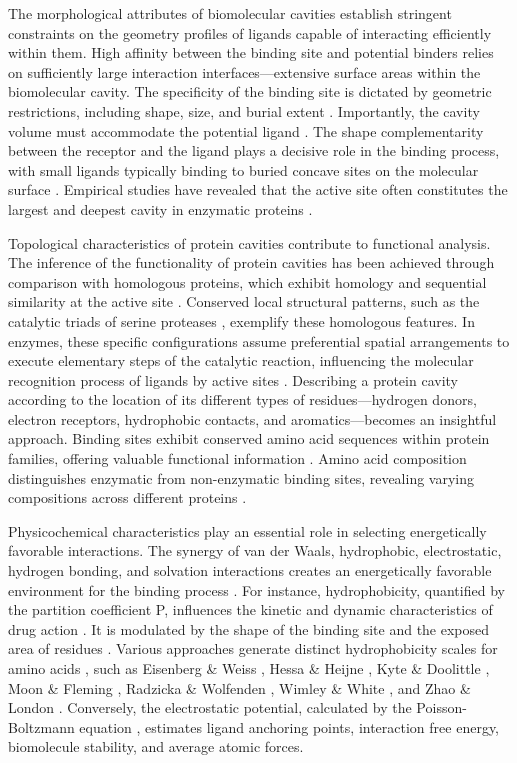 \documentclass[Ingles]{phdthesis}
\begin{document}
The morphological attributes of biomolecular cavities establish stringent constraints on the geometry profiles of ligands capable of interacting efficiently within them. High affinity between the binding site and potential binders relies on sufficiently large interaction interfaces---extensive surface areas within the biomolecular cavity. The specificity of the binding site is dictated by geometric restrictions, including shape, size, and burial extent \cite{laskowski1996,liang1998}. Importantly, the cavity volume must accommodate the potential ligand \cite{stank2016}. The shape complementarity between the receptor and the ligand plays a decisive role in the binding process, with small ligands typically binding to buried concave sites on the molecular surface \cite{henrich2010}. Empirical studies have revealed that the active site often constitutes the largest and deepest cavity in enzymatic proteins \cite{laskowski1996}.

Topological characteristics of protein cavities contribute to functional analysis. The inference of the functionality of protein cavities has been achieved through comparison with homologous proteins, which exhibit homology and sequential similarity at the active site \cite{juncker2009}. Conserved local structural patterns, such as the catalytic triads of serine proteases \cite{dodson1998}, exemplify these homologous features. In enzymes, these specific configurations assume preferential spatial arrangements to execute elementary steps of the catalytic reaction, influencing the molecular recognition process of ligands by active sites \cite{sotriffer2002,henrich2010,thornton2000}. Describing a protein cavity according to the location of its different types of residues---hydrogen donors, electron receptors, hydrophobic contacts, and aromatics---becomes an insightful approach. Binding sites exhibit conserved amino acid sequences within protein families, offering valuable functional information \cite{henrich2010}. Amino acid composition distinguishes enzymatic from non-enzymatic binding sites, revealing varying compositions across different proteins \cite{guerra2019,carlson2008}.

Physicochemical characteristics play an essential role in selecting energetically favorable interactions. The synergy of van der Waals, hydrophobic, electrostatic, hydrogen bonding, and solvation interactions creates an energetically favorable environment for the binding process \cite{henrich2010}. For instance, hydrophobicity, quantified by the partition coefficient P, influences the kinetic and dynamic characteristics of drug action \cite{mannhold2009}. It is modulated by the shape of the binding site and the exposed area of residues \cite{henrich2010}. Various approaches generate distinct hydrophobicity scales for amino acids \cite{heiden1993}, such as Eisenberg \& Weiss \cite{eisenberg1984}, Hessa \& Heijne \cite{hessa2005}, Kyte \& Doolittle \cite{kyte1982}, Moon \& Fleming \cite{moon2011}, Radzicka \& Wolfenden \cite{radzicka1988}, Wimley \& White \cite{wimley1996}, and Zhao \& London \cite{zhao2006}. Conversely, the electrostatic potential, calculated by the Poisson-Boltzmann equation \cite{honig1995}, estimates ligand anchoring points, interaction free energy, biomolecule stability, and average atomic forces.
\end{document}
